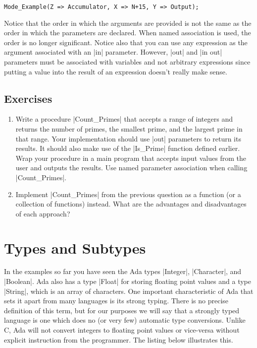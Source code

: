\begin{lstlisting}
Mode_Example(Z => Accumulator, X => N+15, Y => Output);
\end{lstlisting}

\noindent Notice that the order in which the arguments are provided is not the same as the order
in which the parameters are declared. When named association is used, the order is no longer
significant. Notice also that you can use any expression as the argument associated with an |in|
parameter. However, |out| and |in out| parameters must be associated with variables and not
arbitrary expressions since putting a value into the result of an expression doesn't really
make sense.

\subsection*{Exercises}

\begin{enumerate}
\item Write a procedure |Count_Primes| that accepts a range of integers and returns the number
  of primes, the smallest prime, and the largest prime in that range. Your implementation should
  use |out| parameters to return its results. It should also make use of the |Is_Prime| function
  defined earlier. Wrap your procedure in a main program that accepts input values from the user
  and outputs the results. Use named parameter association when calling |Count_Primes|.

\item Implement |Count_Primes| from the previous question as a function (or a collection of
  functions) instead. What are the advantages and disadvantages of each approach?
\end{enumerate}

\section{Types and Subtypes}

In the examples so far you have seen the Ada types |Integer|, |Character|, and |Boolean|. Ada
also has a type |Float| for storing floating point values and a type |String|, which is an array
of characters. One important characteristic of Ada that sets it apart from many languages is its
strong typing. There is no precise definition of this term, but for our purposes we will say
that a strongly typed language is one which does no (or very few) automatic type conversions.
Unlike C, Ada will not convert integers to floating point values or vice-versa without explicit
instruction from the programmer. The listing below illustrates this.

